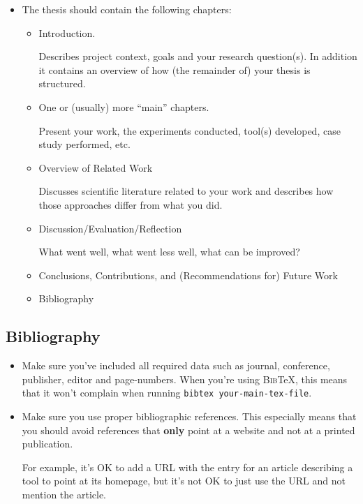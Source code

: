 \begin{itemize}
\item The thesis should contain the following chapters:
\begin{itemize}
\item Introduction.

  Describes project context, goals and your research question(s). In
  addition it contains an overview of how (the remainder of) your
  thesis is structured.

\item One or (usually) more ``main'' chapters.

  Present your work, the experiments conducted, tool(s) developed,
  case study performed, etc.

\item Overview of Related Work

  Discusses scientific literature related to your work and describes
  how those approaches differ from what you did.

\item Discussion/Evaluation/Reflection

  What went well, what went less well, what can be improved?

\item Conclusions, Contributions, and (Recommendations for) Future Work

\item Bibliography

\end{itemize}
\end{itemize}


\subsection{Bibliography}

\begin{itemize}
\item Make sure you've included all required data such as journal,
  conference, publisher, editor and page-numbers. When you're using
  \textsc{Bib}\TeX{}, this means that it won't complain when running
  \texttt{bibtex your-main-tex-file}.
 
\item Make sure you use proper bibliographic references. This
  especially means that you should avoid references that \textbf{only}
  point at a website and not at a printed publication.

  For example, it's OK to add a URL with the entry for an article
  describing a tool to point at its homepage, but it's not OK to just
  use the URL and not mention the article.
\end{itemize}


